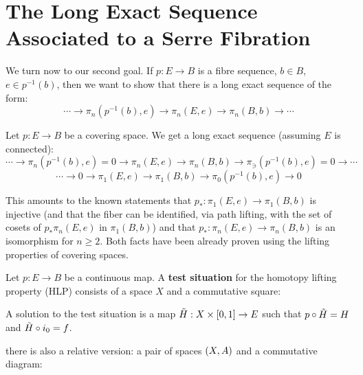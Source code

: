 \section{The Long Exact Sequence Associated to a Serre Fibration}

We turn now to our second goal. If $p:E\to B$ is a fibre sequence, $b\in B$, $e\in p^{-1}(b)$, then we want to show that there is a long exact sequence of the form:
\[\cdots\to\pi_n(p^{-1}(b),e)\to\pi_n(E,e)\to\pi_n(B,b)\to\cdots\]

\begin{example}
Let $p:E\to B$ be a covering space. We get a long exact sequence (assuming $E$ is connected):
\[\cdots\to\pi_n(p^{-1}(b),e)=0\to\pi_n(E,e)\to\pi_n(B,b)\to\pi_\ni(p^{-1}(b),e)=0\to\cdots\]
\[\cdots\to 0 \to\pi_1(E,e)\to\pi_1(B,b)\to\pi_0(p^{-1}(b),e)\to 0\]

This amounts to the known statements that $p_*:\pi_1(E,e)\to\pi_1(B,b)$ is injective (and that the fiber can be identified, via path lifting, with the set of cosets of $p_*\pi_n(E,e)$ in $\pi_1(B,b)$) and that $p_*:\pi_n(E,e)\to\pi_n(B,b)$ is an isomorphism for $n\geq 2$. Both facts have been already proven using the lifting properties of covering spaces.
\end{example}

Let $p:E\to B$ be a continuous map. A \textbf{test situation} for the homotopy lifting property (HLP) consists of a space $X$ and a commutative square:
\begin{center}
\end{center}

A solution to the test situation is a map $\tilde H:X\times[0,1]\to E$
 such that $p\circ\tilde H=H$ and $\tilde H\circ i_0=f$.
 
 there is also a relative version: a pair of spaces $(X,A)$ and a commutative diagram:
\begin{center}
\end{center}

